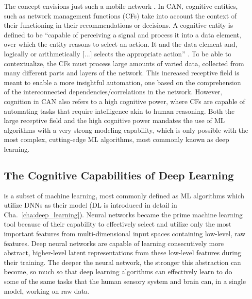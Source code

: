			The  concept envisions just such a mobile network \cite{can_book}.
			In \ac{CAN}, cognitive entities, such as network management functions (\acp{CF}) take into account the context of their functioning in their recommendations or decisions.
			A cognitive entity is defined to be ``capable of perceiving a signal and process it into a data element, over which the entity reasons to select an action.
			It  and  the data element and, logically or arithmetically [...] selects the appropriate action'' \cite{can_book}.	
			To be able to contextualize, the \acp{CF} must process large amounts of varied data, collected from many different parts and layers of the network.
			This increased receptive field is meant to enable a more insightful automation, one based on the comprehension of the interconnected dependencies/correlations in the network.
			However, cognition in \ac{CAN} also refers to a high cognitive power, where \acp{CF} are capable of automating tasks that require intelligence akin to human reasoning.
			Both the large receptive field and the high cognitive power mandates the use of \ac{ML} algorithms with a very strong modeling capability, which is only possible with the most complex, cutting-edge \ac{ML} algorithms, most commonly known as deep learning.
			
		\subsection{The Cognitive Capabilities of Deep Learning}
			\label{cha:intro:sec:cognitive_cap_dl}
			
			 is a subset of machine learning, most commonly defined as \ac{ML} algorithms which utilize \acp{DNN} as their model (\ac{DL} is introduced in detail in Cha.~\ref{cha:deep_learning}).	
			Neural networks became the prime machine learning tool because of their capability to effectively select and utilize only the most important features from multi-dimensional input spaces containing low-level, raw features.
			Deep neural networks are capable of learning consecutively more abstract, higher-level latent representations from these low-level features during their training.
			The deeper the neural network, the stronger this abstraction can become, so much so that deep learning algorithms can effectively learn to do some of the same tasks that the human sensory system and brain can, in a single model, working on raw data.
						
